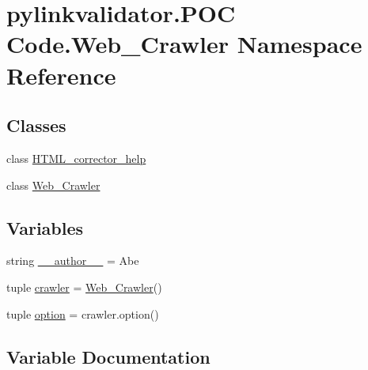\hypertarget{namespacepylinkvalidator_1_1_p_o_c_01_code_1_1_web___crawler}{}\section{pylinkvalidator.\+P\+OC Code.\+Web\+\_\+\+Crawler Namespace Reference}
\label{namespacepylinkvalidator_1_1_p_o_c_01_code_1_1_web___crawler}
\subsection*{Classes}
\begin{DoxyCompactItemize}
\item 
class \hyperlink{classpylinkvalidator_1_1_p_o_c_01_code_1_1_web___crawler_1_1_h_t_m_l__corrector__help}{H\+T\+M\+L\+\_\+corrector\+\_\+help}
\item 
class \hyperlink{classpylinkvalidator_1_1_p_o_c_01_code_1_1_web___crawler_1_1_web___crawler}{Web\+\_\+\+Crawler}
\end{DoxyCompactItemize}
\subsection*{Variables}
\begin{DoxyCompactItemize}
\item 
string \hyperlink{namespacepylinkvalidator_1_1_p_o_c_01_code_1_1_web___crawler_a29affd71d39a1882ce8bba5aab752d93}{\+\_\+\+\_\+author\+\_\+\+\_\+} = \textquotesingle{}Abe\textquotesingle{}
\item 
tuple \hyperlink{namespacepylinkvalidator_1_1_p_o_c_01_code_1_1_web___crawler_a5705d7998995ead364d203ed5cf4410c}{crawler} = \hyperlink{classpylinkvalidator_1_1_p_o_c_01_code_1_1_web___crawler_1_1_web___crawler}{Web\+\_\+\+Crawler}()
\item 
tuple \hyperlink{namespacepylinkvalidator_1_1_p_o_c_01_code_1_1_web___crawler_ab229bf4382abf99f92e073a92aa85348}{option} = crawler.\+option()
\end{DoxyCompactItemize}


\subsection{Variable Documentation}
